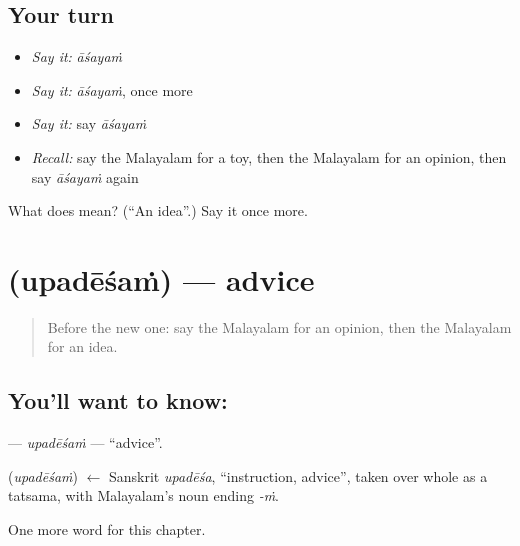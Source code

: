 \subsection*{Your turn}
\begin{itemize}
\raggedright
  \item \emph{Say it:} \emph{āśayaṁ}
  \item \emph{Say it:} \emph{āśayaṁ}, once more
  \item \emph{Say it:} say \emph{āśayaṁ}
  \item \emph{Recall:} say the Malayalam for a toy, then the Malayalam for an opinion, then say \emph{āśayaṁ} again
\end{itemize}

\begin{tcolorbox}[breakable,colback=teal!4,colframe=teal!35!black,title={Before you move on}]
What does  mean? (\textquotedblleft{}An idea\textquotedblright{}.) Say it once more.
\end{tcolorbox}
\section[\texorpdfstring{\ml{ഉപദേശം} (upadēśaṁ)}{ഉപദേശം (upadēśaṁ)}]{ (upadēśaṁ) — advice}

\label{lesson:ML-C256-upadesam}



\begin{quote}
Before the new one: say the Malayalam for an opinion, then the Malayalam for an idea.
\end{quote}

\subsection*{You'll want to know: }
\textbf{} — \emph{upadēśaṁ} — \textquotedblleft{}advice\textquotedblright{}.

\begin{cousinweb}
\textbf{} (\emph{upadēśaṁ}) $\leftarrow$ Sanskrit \emph{upadēśa}, \textquotedblleft{}instruction, advice\textquotedblright{}, taken over whole as a tatsama, with Malayalam's noun ending \emph{-ṁ}.
\end{cousinweb}

\begin{grammarlens}[title={What you've built}]
One more word for this chapter.
\end{grammarlens}

